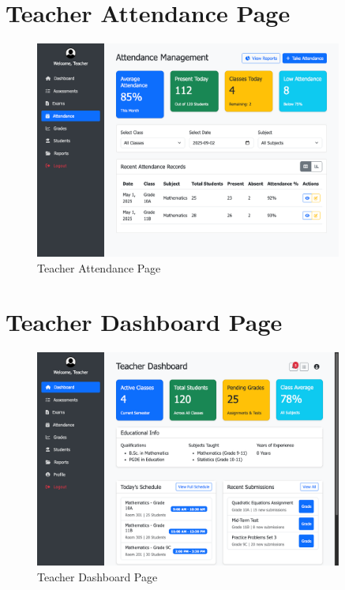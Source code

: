 \documentclass[12pt,a4paper]{report}
\begin{document}
\section{Teacher Attendance Page}
\begin{figure}[htbp]
    \centering
    \includegraphics[width=0.9\textwidth]{teacher-attendance-page.png}
    \caption{Teacher Attendance Page}
    \label{fig:teacher-attendance-page}
\end{figure}

\section{Teacher Dashboard Page}
\begin{figure}[htbp]
    \centering
    \includegraphics[width=0.9\textwidth]{teacher-dashboard-page.png}
    \caption{Teacher Dashboard Page}
    \label{fig:teacher-dashboard-page}
\end{figure}
\end{document}
